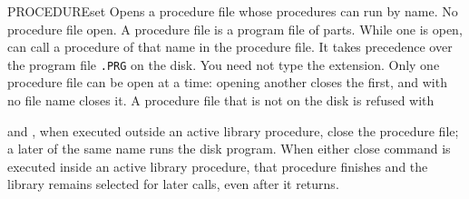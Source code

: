 \begin{XbaseEntry}{PROCEDURE}{set}
Opens a procedure file whose procedures  can run by name.
\Syntax
{}
\Defaults
No procedure file open.
\Usage
A procedure file is a program file of  parts.  While one is
open,   can call a procedure of that name in the procedure
file.  It takes precedence over the program file \texttt{.PRG}
on the disk.
You need not type the extension.  Only one procedure file can be open at a
time: opening another closes the first, and  with no
file name closes it.  A procedure file that is not on the disk is refused
with 

 and , when executed outside an active
library procedure, close the procedure file; a later  of the same
name runs the disk program.  When either close command is executed inside
an active library procedure, that procedure finishes and the library
remains selected for later calls, even after it returns.
\end{XbaseEntry}
